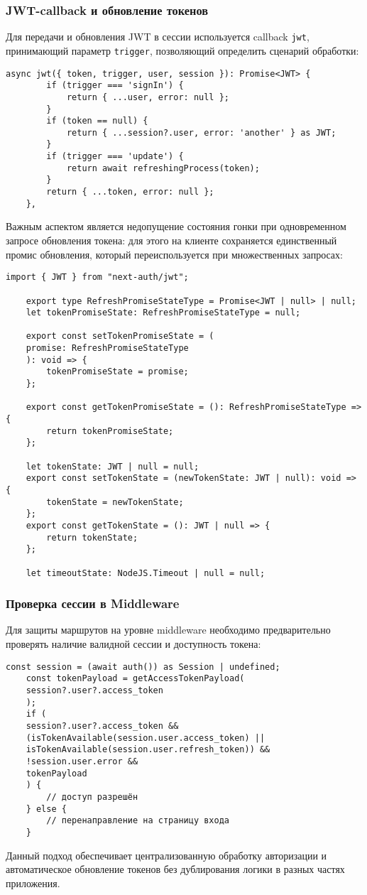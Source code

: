 \subsubsection{JWT-callback и обновление токенов}
Для передачи и обновления JWT в сессии используется callback \texttt{jwt}, принимающий параметр \texttt{trigger}, позволяющий определить сценарий обработки:
\begin{lstlisting}[caption={JWT-callback с учётом trigger}]
	async jwt({ token, trigger, user, session }): Promise<JWT> {
		if (trigger === 'signIn') {
			return { ...user, error: null };
		}
		if (token == null) {
			return { ...session?.user, error: 'another' } as JWT;
		}
		if (trigger === 'update') {
			return await refreshingProcess(token);
		}
		return { ...token, error: null };
	},
\end{lstlisting}

Важным аспектом является недопущение состояния гонки при одновременном запросе обновления токена: для этого на клиенте сохраняется единственный промис обновления, который переиспользуется при множественных запросах:
\begin{lstlisting}[caption={Механизм предотвращения race condition при рефреше токена}]
	import { JWT } from "next-auth/jwt";
	
	export type RefreshPromiseStateType = Promise<JWT | null> | null;
	let tokenPromiseState: RefreshPromiseStateType = null;
	
	export const setTokenPromiseState = (
	promise: RefreshPromiseStateType
	): void => {
		tokenPromiseState = promise;
	};
	
	export const getTokenPromiseState = (): RefreshPromiseStateType => {
		return tokenPromiseState;
	};
	
	let tokenState: JWT | null = null;
	export const setTokenState = (newTokenState: JWT | null): void => {
		tokenState = newTokenState;
	};
	export const getTokenState = (): JWT | null => {
		return tokenState;
	};
	
	let timeoutState: NodeJS.Timeout | null = null;
\end{lstlisting}

\subsubsection{Проверка сессии в Middleware}
Для защиты маршрутов на уровне middleware необходимо предварительно проверять наличие валидной сессии и доступность токена:
\begin{lstlisting}[caption={Пример проверки сессии в Middleware}]
	const session = (await auth()) as Session | undefined;
	const tokenPayload = getAccessTokenPayload(
	session?.user?.access_token
	);
	if (
	session?.user?.access_token &&
	(isTokenAvailable(session.user.access_token) ||
	isTokenAvailable(session.user.refresh_token)) &&
	!session.user.error &&
	tokenPayload
	) {
		// доступ разрешён
	} else {
		// перенаправление на страницу входа
	}
\end{lstlisting}

Данный подход обеспечивает централизованную обработку авторизации и автоматическое обновление токенов без дублирования логики в разных частях приложения.


